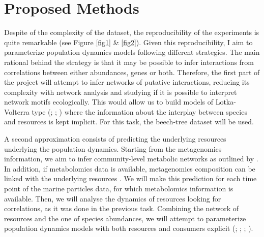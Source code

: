 \documentclass[11pt, onehalfspacing]{article}
\begin{document}



\section{Proposed Methods}



Despite of the complexity of the dataset, the reproducibility of the experiments is quite remarkable (see Figure \ref{fig1} \& \ref{fig2}). Given this reproducibility, I aim to parameterize population dynamics models following different strategies. The main rational behind the strategy is that it may be possible to infer interactions from correlations between either abundances, genes or both. Therefore, the first part of the project will attempt to infer networks of putative interactions, reducing its complexity with network analysis and studying if it is possible to interpret network motifs ecologically. This would allow us to build models of Lotka-Volterra type (\citep{allesina2012stability}; \citep{taillefumier2017microbial}; \citep{marsland2019available}) where the information about the interplay between species and resources is kept implicit. For this task, the beech-tree dataset will be used.

A second approximation consists of predicting the underlying resources underlying the population dynamics. Starting from the metagenomics information, we aim to infer community-level metabolic networks as outlined by \citep{henry2016microbial}. In addition, if metabolomics data is available, metagenomics composition can be linked with the underlying resources \citep{noecker2016metabolic}. We will make this prediction for each time point of the marine particles data, for which metabolomics information is available. Then, we will analyse the dynamics of resources looking for correlations, as it was done in the previous task. Combining the network of resources and the one of species abundances, we will attempt to parameterize population dynamics models with both resources and consumers explicit (\citep{marsland2019available}; \citep{taillefumier2017microbial} \citep{posfai2017metabolic}; \citep{goyal2018diversity}; \citep{tikhonov2017collective}). 
\end{document}
